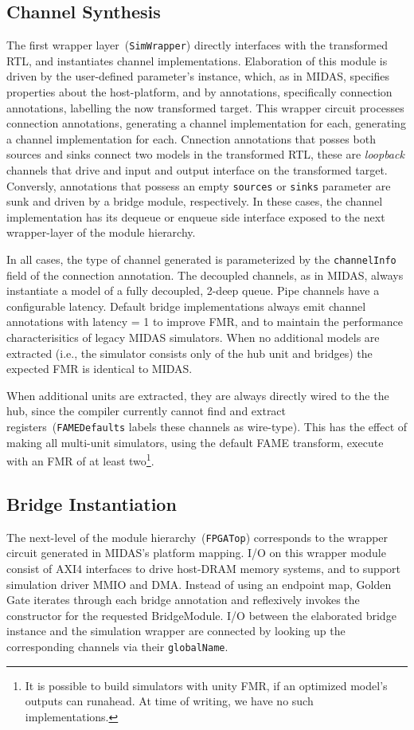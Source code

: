 \subsection{Channel Synthesis}
The first wrapper layer~(\texttt{SimWrapper}) directly interfaces with the transformed RTL, and instantiates
channel implementations. Elaboration of this module is driven by the user-defined parameter's instance,
which, as in MIDAS, specifies properties about the host-platform, and by
annotations, specifically connection annotations, labelling the now transformed target.
This wrapper circuit processes connection annotations, generating a channel
implementation for each, generating a channel implementation for each.  Cnnection annotations that posses both sources and sinks
connect two models in the transformed RTL, these are \emph{loopback} channels
that drive and input and output interface on the transformed target. Conversly,
annotations that possess an empty \texttt{sources} or \texttt{sinks} parameter
are sunk and driven by a bridge module, respectively. In these cases, the
channel implementation has its dequeue or enqueue side
interface exposed to the next wrapper-layer of the module hierarchy.

In all cases, the type of channel generated is parameterized by the
\texttt{channelInfo} field of the connection annotation. The decoupled channels, as in
MIDAS, always instantiate a model of a fully decoupled, 2-deep queue. Pipe
channels have a configurable latency. Default bridge implementations always
emit channel annotations with latency = 1 to improve FMR, and to maintain the
performance characterisitics of legacy MIDAS simulators. When no additional
models are extracted (i.e., the simulator consists only of the hub unit and
bridges) the expected FMR is identical to MIDAS.

When additional units are extracted, they are always directly wired to the the
hub, since the compiler currently cannot find and extract registers~(\texttt{FAMEDefaults} labels these channels as wire-type). This has
the effect of making all multi-unit simulators, using the default FAME
transform, execute with an FMR of at least two\footnote{It is possible to build
simulators with unity FMR, if an optimized model's outputs can runahead. At time
of writing, we have no such implementations.}.

\subsection{Bridge Instantiation}
The next-level of the module hierarchy~(\texttt{FPGATop}) corresponds to the wrapper
circuit generated in MIDAS's platform mapping. I/O on this wrapper module consist of AXI4 interfaces
to drive host-DRAM memory systems, and to support simulation  driver MMIO and DMA.
Instead of using an endpoint map, Golden Gate iterates through each bridge annotation and reflexively invokes the constructor for the requested BridgeModule. I/O between the elaborated
bridge instance and the simulation wrapper are connected by looking up the
corresponding channels via their \texttt{globalName}.

